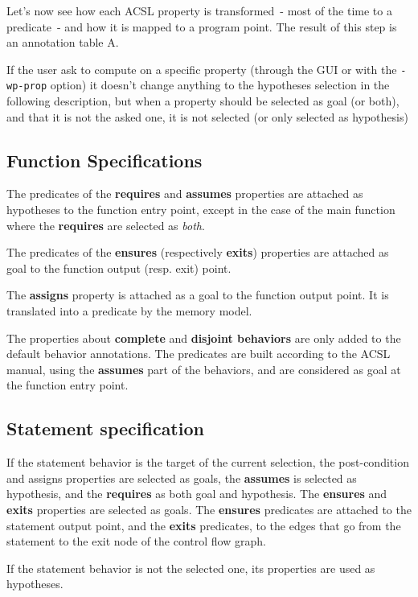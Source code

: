 Let's now see how each ACSL property is transformed~- most of the time to a
predicate~- and how it is mapped to a program
point. The result of this step is an annotation table A. 

If the user ask to compute on a specific property 
(through the GUI or with the {\tt -wp-prop} option)
it doesn't change anything to the hypotheses selection
in the following description,
but when a property should be selected as goal (or both), 
and that it is not the asked one,
it is not selected (or only selected as hypothesis) 

\subsection{Function Specifications}

The predicates of the  {\bf requires} and  {\bf assumes} properties
are attached as hypotheses to the function entry point,
except in the case of the main function where 
the {\bf requires} are selected as {\it both}.

The predicates of the  {\bf ensures} (respectively {\bf exits}) properties
are attached as goal
to the function output (resp. exit) point.

The {\bf assigns} property
is attached as a goal to the function output point.
It is translated into a predicate by the memory model.

The properties about {\bf complete} and {\bf disjoint behaviors}
are only added to the default behavior annotations.
The predicates are built according to the ACSL manual, using the
{\bf assumes} part of the behaviors, and are considered as goal
at the function entry point.

\subsection{Statement specification}

If the statement behavior is the target of the current selection,
the post-condition and assigns properties are selected as goals,
the {\bf assumes} is selected as hypothesis, and the {\bf requires}
as both goal and hypothesis. The {\bf ensures} and {\bf exits}
properties are selected as goals. The {\bf ensures} predicates
are attached to the statement output point,
and the {\bf exits} predicates, to the edges that go from the statement
to the exit node of the control flow graph.

If the statement behavior is not the selected one,
its properties are used as hypotheses.

